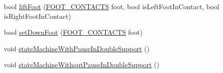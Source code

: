 \begin{DoxyCompactItemize}
bool \hyperlink{classSteppingDemoClient_ae406e5c8f755f234272b63de4d6a774f}{lift\+Foot} (\hyperlink{SteppingDemoClient_8h_ab0673d7f17cdd57b8fa124abb330287f}{F\+O\+O\+T\+\_\+\+C\+O\+N\+T\+A\+C\+TS} foot, bool is\+Left\+Foot\+In\+Contact, bool is\+Right\+Foot\+In\+Contact)
\item 
bool \hyperlink{classSteppingDemoClient_a930123dad5658ea8a3bb5f23cb4cb369}{set\+Down\+Foot} (\hyperlink{SteppingDemoClient_8h_ab0673d7f17cdd57b8fa124abb330287f}{F\+O\+O\+T\+\_\+\+C\+O\+N\+T\+A\+C\+TS} foot)
\item 
void \hyperlink{classSteppingDemoClient_a346a8fd10641897532a26f598db7799d}{state\+Machine\+With\+Pause\+In\+Double\+Support} ()
\item 
void \hyperlink{classSteppingDemoClient_a256284578a6b9818a8f726451d2fb2c4}{state\+Machine\+Without\+Pause\+In\+Double\+Support} ()
\end{DoxyCompactItemize}
